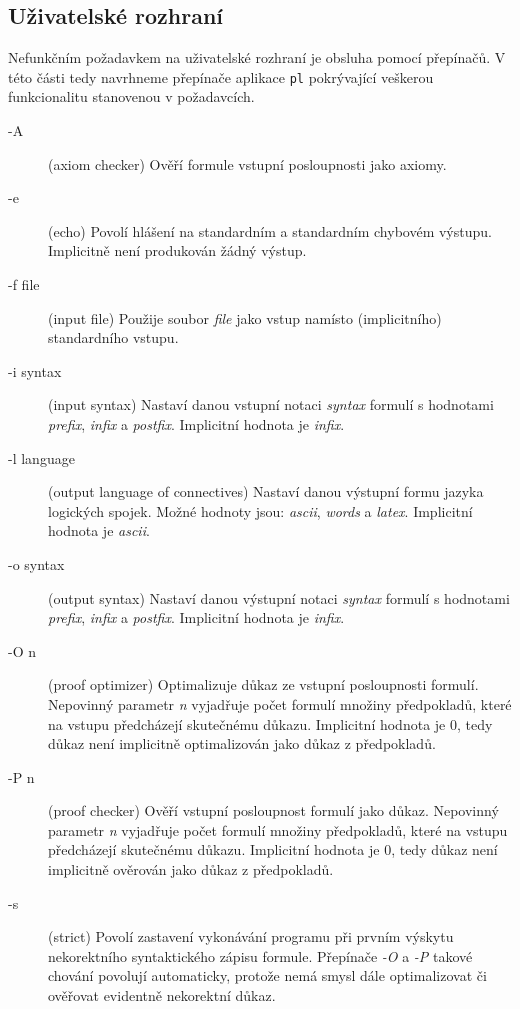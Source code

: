\documentclass[thesis=B,czech,hidelinks]{thesis}[2012/06/26]
\begin{document}
\subsection{Uživatelské rozhraní}

Nefunkčním požadavkem na uživatelské rozhraní je obsluha pomocí přepínačů. V této části tedy navrhneme přepínače aplikace \texttt{pl} pokrývající veškerou funkcionalitu stanovenou v požadavcích. 

\begin{description}
	\item[-A] (axiom checker) Ověří formule vstupní posloupnosti jako axiomy.
	\item[-e] (echo) Povolí hlášení na standardním a standardním chybovém výstupu. Implicitně není produkován žádný výstup.
	\item[-f file] (input file) Použije soubor \emph{file} jako vstup namísto (implicitního) standardního vstupu.
	\item[-i syntax] (input syntax) Nastaví danou vstupní notaci \emph{syntax} formulí s hodnotami \emph{prefix}, \emph{infix} a \emph{postfix}. Implicitní hodnota je \emph{infix}.
	\item[-l language] (output language of connectives) Nastaví danou výstupní formu jazyka logických spojek. Možné hodnoty jsou: \emph{ascii}, \emph{words} a \emph{latex}. Implicitní hodnota je \emph{ascii}.
	\item[-o syntax] (output syntax) Nastaví danou výstupní notaci \emph{syntax} formulí s hodnotami \emph{prefix}, \emph{infix} a \emph{postfix}. Implicitní hodnota je \emph{infix}.
	\item[-O n] (proof optimizer) Optimalizuje důkaz ze vstupní posloupnosti formulí. Nepovinný parametr \emph{n} vyjadřuje počet formulí množiny předpokladů, které na vstupu předcházejí skutečnému důkazu. Implicitní hodnota je 0, tedy důkaz není implicitně optimalizován jako důkaz z předpokladů.
	\item[-P n] (proof checker) Ověří vstupní posloupnost formulí jako důkaz. Nepovinný parametr \emph{n} vyjadřuje počet formulí množiny předpokladů, které na vstupu předcházejí skutečnému důkazu. Implicitní hodnota je 0, tedy důkaz není implicitně ověrován jako důkaz z předpokladů.
	\item[-s] (strict) Povolí zastavení vykonávání programu při prvním výskytu nekorektního syntaktického zápisu formule. Přepínače \emph{-O} a \emph{-P} takové chování povolují automaticky, protože nemá smysl dále optimalizovat či ověřovat evidentně nekorektní důkaz.
\end{description}
\end{document}

